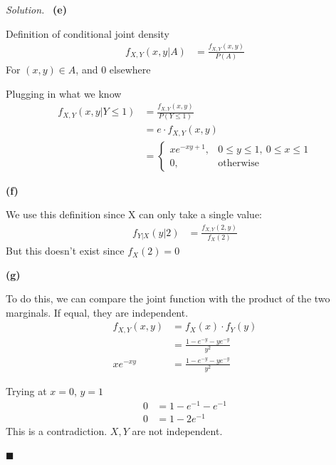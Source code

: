 \documentclass[11pt]{article}
\newenvironment{solution}
{\par\medskip\noindent\textit{Solution.}\ }
{\hfill$\blacksquare$\par\medskip}
\begin{document}
\begin{solution}
        \vspace{1em}
        \textbf{(e)}

        Definition of conditional joint density
        \begin{align*}
            f_{X,Y}(x,y | A) &= \frac{f_{X, Y}(x, y)}{P(A)}
        \end{align*}
        For $(x, y) \in A$, and $0$ elsewhere

        Plugging in what we know
        \begin{align*}
            f_{X,Y}(x,y | Y \leq 1) &= \frac{f_{X, Y}(x, y)}{P(Y \leq 1)} \\
            &= e \cdot f_{X, Y}(x, y) \\
            &= \begin{cases}
                           xe^{-xy + 1}, & 0 \le y \le 1,\ 0 \le x \le 1\\
                           0, & \text{otherwise}
            \end{cases}
        \end{align*}

        \vspace{1em}
        \textbf{(f)}

        We use this definition since X can only take a single value:
        \begin{align*}
            f_{Y | X}(y | 2) &= \frac{f_{X, Y}(2, y)}{f_X(2)}
        \end{align*}
        But this doesn't exist since $f_X(2) = 0$

        \vspace{1em}
        \textbf{(g)}

        To do this, we can compare the joint function with the product of the two marginals.
        If equal, they are independent.
        \begin{align*}
            f_{X,Y}(x,y) &= f_X(x)\cdot f_Y(y) \\
            &= \frac{1 - e^{-y} - y e^{-y}}{y^2} \\
            xe^{-xy} &= \frac{1 - e^{-y} - y e^{-y}}{y^2}
        \end{align*}

        Trying at $x = 0$, $y = 1$
        \begin{align*}
            0 &= 1 - e^{-1} - e^{-1} \\
            0 &= 1 - 2e^{-1}
        \end{align*}
        This is a contradiction.
        $X, Y$ are not independent.


\end{solution}
\end{document}
